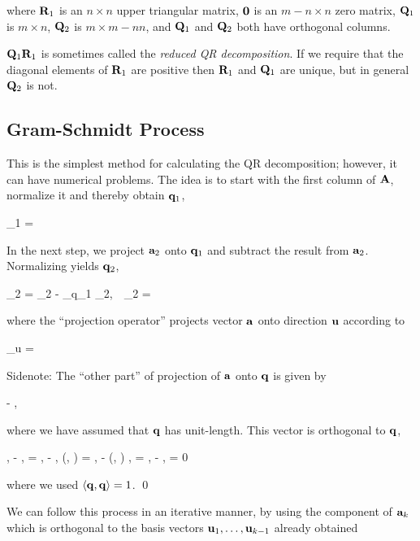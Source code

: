 where $\mathbf{R}_1$ is an $n \times n$ upper triangular matrix, $\mathbf{0}$ is an $m - n \times n$ zero matrix, $\mathbf{Q}_1$ is $m \times n$, $\mathbf{Q}_2$ is $m \times m - nn$, and $\mathbf{Q}_1$ and $\mathbf{Q}_2$ both have orthogonal columns.

$\mathbf{Q}_1 \mathbf{R}_1$ is sometimes called the \emph{reduced QR decomposition}. If we require that the diagonal elements of $\mathbf{R}_1$ are positive then $\mathbf{R}_1$ and $\mathbf{Q}_1$ are unique, but in general $\mathbf{Q}_2$ is not.

\subsection{Gram-Schmidt Process}

This is the simplest method for calculating the QR decomposition; however, it can have numerical problems. The idea is to start with the first column of $\mathbf{A}$, normalize it and thereby obtain $\mathbf{q}_1$,

\bee
\qbf_1 = 
\eee

In the next step, we project $\mathbf{a}_2$ onto $\mathbf{q}_1$ and subtract the result from $\mathbf{a}_2$. Normalizing yields $\mathbf{q}_2$,

\bee
\ubf_2 = \abf_2 - _{q_1} \abf_2, \,\, \qbf_2 = 
\eee

where the ``projection operator'' projects vector $\mathbf{a}$ onto direction $\mathbf{u}$ according to

\bee
{}_{u} \abf = \frac{\langle \ubf, \abf \rangle}{\langle \ubf, \ubf \rangle} \ubf
\eee

Sidenote: The ``other part'' of projection of $\mathbf{a}$ onto $\mathbf{q}$ is given by 

\bee
\abf - \langle \abf, \qbf \rangle \qbf
\eee

where we have assumed that $\mathbf{q}$ has unit-length. This vector is orthogonal to $\mathbf{q}$,

\bee
\langle \qbf, \abf - \langle \abf, \qbf \rangle \qbf \rangle = \langle \qbf, \abf \rangle - \langle \qbf, (\langle \abf, \qbf \rangle) \qbf \rangle = \langle \qbf, \abf \rangle - (\langle \abf, \qbf \rangle) \langle \qbf, \qbf \rangle =  \langle \qbf, \abf \rangle - \langle \abf, \qbf \rangle = 0
\eee

where we used $\langle \mathbf{q}, \mathbf{q} \rangle = 1$. \qed

We can follow this process in an iterative manner, by using the component of $\mathbf{a}_k$ which is orthogonal to the basis vectors $\mathbf{u}_1, \ldots,\mathbf{u}_{k-1}$ already obtained

